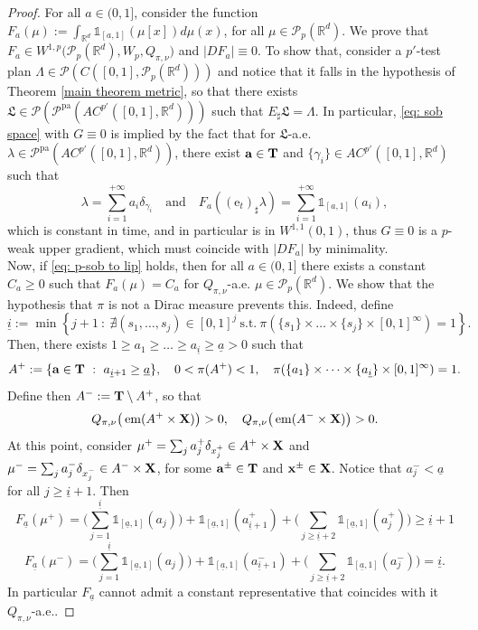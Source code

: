 \documentclass[10pt,leqno]{amsart}
\numberwithin{equation}{section}
\newcommand{\R}{\mathbb{R}}
\newcommand{\Q}{\mathbb{Q}}
\newcommand{\PP}{\mathcal{P}}
\newcommand{\PPpa}{\PP^{\operatorname{pa}}}
\newcommand{\e}{\mathrm{e}}
\renewcommand{\Q}{Q}
\begin{document}
\begin{proof}
    For all $a\in(0,1]$, consider the function $F_{a}(\mu):= \int_{\R^d} \mathds{1}_{[a,1]}(\mu[x]) d\mu(x)$, for all $\mu\in \PP_p(\R^d)$. We prove that $F_a \in W^{1,p}\big(\PP_p(\R^d),W_p,Q_{\pi,\nu}\big)$ and $|DF_a|\equiv 0$. To show that, consider a $p'$-test plan $\Lambda \in \PP(C([0,1],\PP_p(\R^d)))$ and notice that it falls in the hypothesis of Theorem \ref{main theorem metric}, so that there exists $\mathfrak{L}\in \PP(\PPpa(AC^{p'}([0,1],\R^d)))$ such that $E_\sharp \mathfrak{L} = \Lambda$. In particular, \eqref{eq: sob space} with $G\equiv 0$ is implied by the fact that for $\mathfrak{L}$-a.e. $\lambda \in \PPpa(AC^{p'}([0,1],\R^d))$, there exist $\mathbf{a}\in \bold{T}$ and $\{\gamma_i\} \in AC^{p'}([0,1],\R^d)$ such that 
    \[\lambda = \sum_{i=1}^{+\infty} a_i \delta_{\gamma_i} \quad \text{and} \quad F_a((\e_t)_\sharp \lambda) = \sum_{i=1}^{+\infty} \mathds{1}_{[a,1]}(a_i),\]
    which is constant in time, and in particular is in $W^{1,1}(0,1)$, thus $G\equiv 0$ is a $p$-weak upper gradient, which must coincide with $|DF_a|$ by minimality.
    \\
    Now, if \eqref{eq: p-sob to lip} holds, then for all $a\in(0,1]$ there exists a constant $C_a\geq 0$ such that $F_a(\mu) = C_a$ for $Q_{\pi,\nu}$-a.e. $\mu\in \PP_p(\R^d)$. We show that the hypothesis that $\pi$ is not a Dirac measure prevents this. Indeed, define
    \[\underline{i} := \min\left\{ j+1 \ : \ \nexists (s_1,\dots,s_j) \in [0,1]^j \ \text{s.t.} \ \pi(\{s_1\}\times \dots \times \{s_j\}\times[0,1]^{\infty}) = 1 \right\}.\]
    Then, there exists $1 \geq a_1\geq \dots \geq a_{\underline{i}} \geq \underline{a}>0$ such that 
    \[A^+ := \{\mathbf{a}\in \bold{T} \ : \ a_{\underline{i}+1} \geq \underline{a}\}, \quad 0<\pi(A^+) <1, \quad \pi(\{a_1\}\times \dots \times \{a_{\underline{i}}\}\times[0,1]^{\infty}) = 1.\]
    Define then $A^-:= \bold{T}\setminus A^+$, so that
    \[Q_{\pi,\nu}\big( \operatorname{em}(A^+ \times \bold{X}) \big)>0, \quad Q_{\pi,\nu}\big( \operatorname{em}(A^- \times \bold{X}) \big) >0. \]
    At this point, consider $\mu^+ = \sum_{j} a_j^+ \delta_{x_j^+} \in A^+ \times \bold{X}$ and $\mu^- = \sum_{j} a_j^-\delta_{x_j^-} \in A^- \times \bold{X}$, for some $\bold{a}^{\pm}\in \bold{T}$ and $\bold{x}^{\pm}\in \bold{X}$. Notice that $a_j^- < \underline{a}$ for all $j\geq \underline{i}+1$. Then
    \[F_{\underline{a}}(\mu^+) = \bigg(\sum_{j=1}^{\underline{i}} \mathds{1}_{[\underline{a},1]}(a_j)\bigg) + \mathds{1}_{[\underline{a},1]}(a_{\underline{i}+1}^+) + \bigg(\sum_{j\geq \underline{i}+2} \mathds{1}_{[\underline{a},1]}(a_j^{+})\bigg)\geq \underline{i}+1\]
    \[F_{\underline{a}}(\mu^-) = \bigg(\sum_{j=1}^{\underline{i}} \mathds{1}_{[\underline{a},1]}(a_j)\bigg) + \mathds{1}_{[\underline{a},1]}(a_{\underline{i}+1}^-) + \bigg(\sum_{j\geq \underline{i}+2} \mathds{1}_{[\underline{a},1]}(a_j^{-}) \bigg) = \underline{i}.\]
    In particular $F_{\underline{a}}$ cannot admit a constant representative that coincides with it $\Q_{\pi,\nu}$-a.e..
\end{proof}
\end{document}
